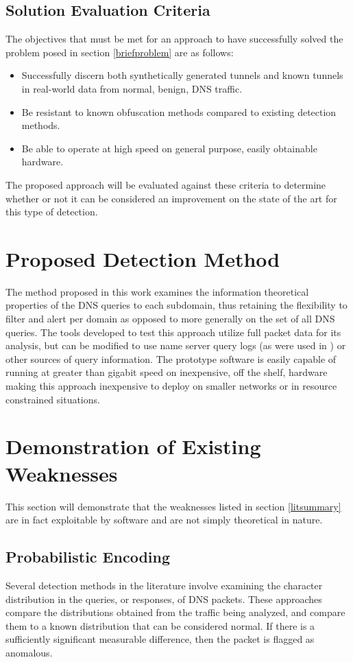 \documentclass[12pt]{article}
\theoremstyle{remark}
\theoremstyle{definition}
\theoremstyle{definition}
\theoremstyle{definition}
\begin{document}
\subsection{Solution Evaluation Criteria}
The objectives that must be met for an approach to have successfully solved the problem posed in section \ref{briefproblem} are as follows:

\begin{itemize}
\item Successfully discern both synthetically generated tunnels and known tunnels
in real-world data from normal, benign, DNS traffic.
\item Be resistant to known obfuscation methods compared to existing detection
methods.
\item Be able to operate at high speed on general purpose, easily obtainable
hardware.
\end{itemize}

The proposed approach will be evaluated against these criteria to determine
whether or not it can be considered an improvement on the state of the art for
this type of detection.

\section{Proposed Detection Method}
\label{datameasurement}

The method proposed in this work examines the information theoretical properties of the
DNS queries to each subdomain, thus retaining the flexibility to filter and
alert per domain as opposed to more generally on the set of all DNS queries. The tools developed to test this approach utilize full packet data for its analysis, but can be modified to use name server query logs (as were used in \cite{Romana2007}) or other sources of query information. The prototype software is easily capable of running at greater than gigabit speed on inexpensive, off the shelf, hardware making this approach inexpensive to deploy on smaller networks or in resource constrained situations.

\section{Demonstration of Existing Weaknesses}
This section will demonstrate that the weaknesses listed in section \ref{litsummary} are in fact exploitable by software and are not simply theoretical in nature.

\subsection{Probabilistic Encoding}
\label{probencode}
Several detection methods in the literature involve examining the character distribution in the queries, or responses, of DNS packets. These approaches compare the distributions obtained from the traffic being analyzed, and compare them to a known distribution that can be considered normal. If there is a sufficiently significant measurable difference, then the packet is flagged as anomalous.
\end{document}

